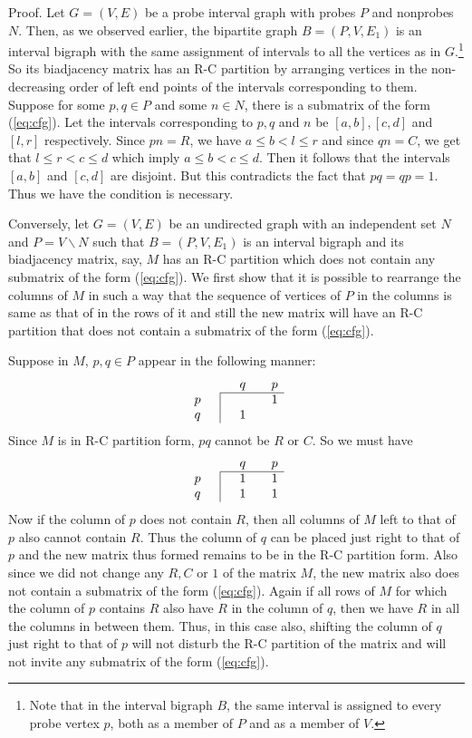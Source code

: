 \documentclass[secthm]{elsart}
\begin{document}
\begin{pf*}{Proof.}
Let $G=(V,E)$ be a probe interval graph with probes $P$ and nonprobes $N$. Then, as we observed earlier, the bipartite graph $B=(P,V,E_1)$ is an interval bigraph with the same assignment of intervals to all the vertices as in $G$.\footnote{Note that in the interval bigraph $B$, the same interval is assigned to every probe vertex $p$, both as a member of $P$ and as a member of $V$.} So its biadjacency matrix has an R-C partition by arranging vertices in the non-decreasing order of left end points of the intervals corresponding to them. Suppose for some $p,q\in P$ and some $n\in N$, there is a submatrix of the form (\ref{eq:cfg}). Let the intervals corresponding to $p,q$ and $n$ be $[a,b],[c,d]$ and $[l,r]$ respectively. Since $pn=R$, we have $a\leqslant b<l\leqslant r$ and since $qn=C$, we get that $l\leqslant r<c\leqslant d$ which imply $a\leqslant b<c\leqslant d$. Then it follows that the intervals $[a,b]$ and $[c,d]$ are disjoint. But this contradicts the fact that $pq=qp=1$. Thus we have the condition is necessary.

Conversely, let $G=(V,E)$ be an undirected graph with an independent set $N$ and $P=V\smallsetminus N$ such that $B=(P,V,E_1)$ is an interval bigraph and its biadjacency matrix, say, $M$ has an R-C partition which does not contain any submatrix of the form (\ref{eq:cfg}). We first show that it is possible to rearrange the columns of $M$ in such a way that the sequence of vertices of $P$ in the columns is same as that of in the rows of it and still the new matrix will have an R-C partition that does not contain a submatrix of the form (\ref{eq:cfg}). 

Suppose in $M$, $p,q\in P$ appear in the following manner:
$$\begin{array}{cc|cccc}
\multicolumn{3}{c}{} & q && p \\ \cline{3-6}
p &&&  && 1 \\
q &&& 1 &&  
\end{array}$$
Since $M$ is in R-C partition form, $pq$ cannot be $R$ or $C$. So we must have
$$\begin{array}{cc|cccc}
\multicolumn{3}{c}{} & q && p \\ \cline{3-6}
p &&& 1 && 1 \\
q &&& 1 && 1 
\end{array}$$
Now if the column of $p$ does not contain $R$, then all columns of $M$ left to that of $p$ also cannot contain $R$. Thus the column of $q$ can be placed just right to that of $p$ and the new matrix thus formed remains to be in the R-C partition form. Also since we did not change any $R,C$ or $1$ of the matrix $M$, the new matrix also does not contain a submatrix of the form (\ref{eq:cfg}). Again if all rows of $M$ for which the column of $p$ contains $R$ also have $R$ in the column of $q$, then we have $R$ in all the columns in between them. Thus, in this case also, shifting the column of $q$ just right to that of $p$ will not disturb the R-C partition of the matrix and will not invite any submatrix of the form (\ref{eq:cfg}). 


\end{pf*}
\end{document}
